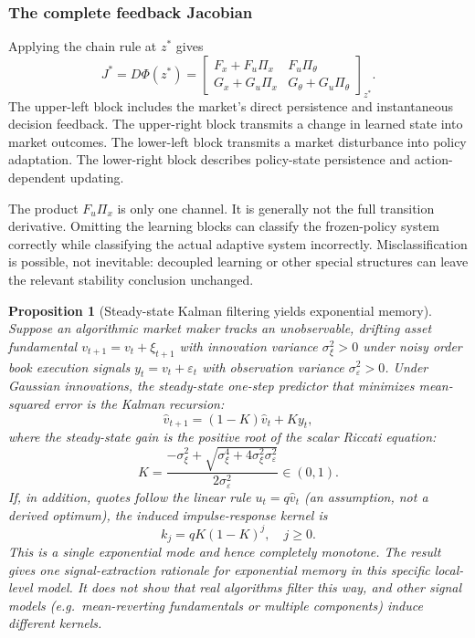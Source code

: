 \documentclass[10pt,twocolumn,letterpaper]{article}
\newtheorem{proposition}[theorem]{Proposition}
\theoremstyle{definition}
\theoremstyle{remark}
\begin{document}
\subsubsection{The complete feedback Jacobian}
Applying the chain rule at $z^*$ gives
\begin{equation}
 J^*=D\Phi(z^*)=
 \begin{bmatrix}
 F_x+F_u\Pi_x & F_u\Pi_\theta\\
 G_x+G_u\Pi_x & G_\theta+G_u\Pi_\theta
 \end{bmatrix}_{z^*}.
 \label{eq:fulljac}
\end{equation}
The upper-left block includes the market's direct persistence and instantaneous decision feedback. The upper-right block transmits a change in learned state into market outcomes. The lower-left block transmits a market disturbance into policy adaptation. The lower-right block describes policy-state persistence and action-dependent updating.

The product $F_u\Pi_x$ is only one channel. It is generally not the full transition derivative. Omitting the learning blocks can classify the frozen-policy system correctly while classifying the actual adaptive system incorrectly. Misclassification is possible, not inevitable: decoupled learning or other special structures can leave the relevant stability conclusion unchanged.

\begin{proposition}[Steady-state Kalman filtering yields exponential memory]
\label{prop:kalman_microfoundation}
Suppose an algorithmic market maker tracks an unobservable, drifting asset fundamental $v_{t+1} = v_t + \xi_{t+1}$ with innovation variance $\sigma_\xi^2 > 0$ under noisy order book execution signals $y_t = v_t + \varepsilon_t$ with observation variance $\sigma_\varepsilon^2 > 0$. Under Gaussian innovations, the steady-state one-step predictor that minimizes mean-squared error is the Kalman recursion:
\begin{equation}
    \hat{v}_{t+1} = (1 - K) \hat{v}_t + K y_t,
    \label{eq:kalman_filter}
\end{equation}
where the steady-state gain is the positive root of the scalar Riccati equation:
\begin{equation}
    K = \frac{-\sigma_\xi^2 + \sqrt{\sigma_\xi^4 + 4\sigma_\xi^2 \sigma_\varepsilon^2}}{2\sigma_\varepsilon^2} \in (0, 1).
    \label{eq:kalman_gain}
\end{equation}
If, in addition, quotes follow the linear rule $u_t = q \hat{v}_t$ (an assumption, not a derived optimum), the induced impulse-response kernel is
\begin{equation}
    k_j = q K (1 - K)^j, \quad j \ge 0.
    \label{eq:kalman_kernel}
\end{equation}
This is a single exponential mode and hence completely monotone. The result gives one signal-extraction rationale for exponential memory in this specific local-level model. It does not show that real algorithms filter this way, and other signal models (e.g.\ mean-reverting fundamentals or multiple components) induce different kernels.
\end{proposition}
\end{document}
